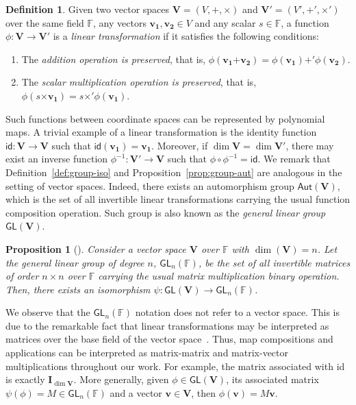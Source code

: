 \documentclass[12pt, a4paper, oneside]{memoir}
\newtheorem{proposition}[theorem]{Proposition}
\theoremstyle{definition}
\newtheorem{definition}[theorem]{Definition}
\begin{document}
\begin{definition}
  Given two vector spaces $\mathbf{V} = (V, \bm{+}, \bm{\times})$ and $\mathbf{V'} = (V', \bm{+'}, \bm{\times'})$ over the same field $\mathbb{F}$, any vectors $\mathbf{v_{1}}, \mathbf{v_{2}} \in V$ and any scalar $s \in \mathbb{F}$, a function $\phi : \mathbf{V} \to \mathbf{V'}$ is a \emph{linear transformation} if it satisfies the following conditions:
  
  \begin{enumerate}
    \item The \emph{addition operation is preserved}, that is, $\phi(\mathbf{v_{1}} \bm{+} \mathbf{v_{2}}) = \phi(\mathbf{v_{1}}) \bm{+'} \phi(\mathbf{v_{2}})$.
    \item The \emph{scalar multiplication operation is preserved}, that is, $\phi(s \bm{\times} \mathbf{v_{1}}) = s \bm{\times'} \phi(\mathbf{v_{1}})$.
  \end{enumerate} 
\end{definition}

Such functions between coordinate spaces can be represented by polynomial maps. A trivial example of a linear transformation is the identity function $\mathsf{id} : \mathbf{V} \to \mathbf{V}$ such that $\mathsf{id}(\mathbf{v_{1}}) = \mathbf{v_{1}}$. Moreover, if $\dim \mathbf{V} = \dim \mathbf{V'}$, there may exist an inverse function $\phi^{-1} : \mathbf{V'} \to \mathbf{V}$ such that $\phi \circ \phi^{-1} = \mathsf{id}$. We remark that Definition~\ref{def:group-iso} and Proposition~\ref{prop:group-aut} are analogous in the setting of vector spaces. Indeed, there exists an automorphism group $\mathsf{Aut}(\mathbf{V})$, which is the set of all invertible linear transformations carrying the usual function composition operation. Such group is also known as the \emph{general linear group} $\mathsf{GL}(\mathbf{V})$.

\begin{proposition}[{\cite[p.~418, Cor.~14]{Dummit:2003}}]
  Consider a vector space $\mathbf{V}$ over $\mathbb{F}$ with $\dim(\mathbf{V}) = n$. Let the \emph{general linear group of degree $n$, $\mathsf{GL}_{n}(\mathbb{F})$}, be the set of all invertible matrices of order $n \times n$ over $\mathbb{F}$ carrying the usual matrix multiplication binary operation. Then, there exists an isomorphism $\psi : \mathsf{GL}(\mathbf{V}) \to \mathsf{GL}_{n}(\mathbb{F})$.
\end{proposition}

We observe that the $\mathsf{GL}_{n}(\mathbb{F})$ notation does not refer to a vector space. This is due to the remarkable fact that linear transformations may be interpreted as matrices over the base field of the vector space~\cite[Section 11.2]{Dummit:2003}. Thus, map compositions and applications can be interpreted as matrix-matrix and matrix-vector multiplications throughout our work. For example, the matrix associated with \textsf{id} is exactly $\mathbf{I}_{\dim \mathbf{V}}$. More generally, given $\phi \in \mathsf{GL}(\mathbf{V})$, its associated matrix $\psi(\phi) = M \in \mathsf{GL}_{n}(\mathbb{F})$ and a vector $\mathbf{v} \in \mathbf{V}$, then $\phi(\mathbf{v}) = M\mathbf{v}$.
\end{document}
